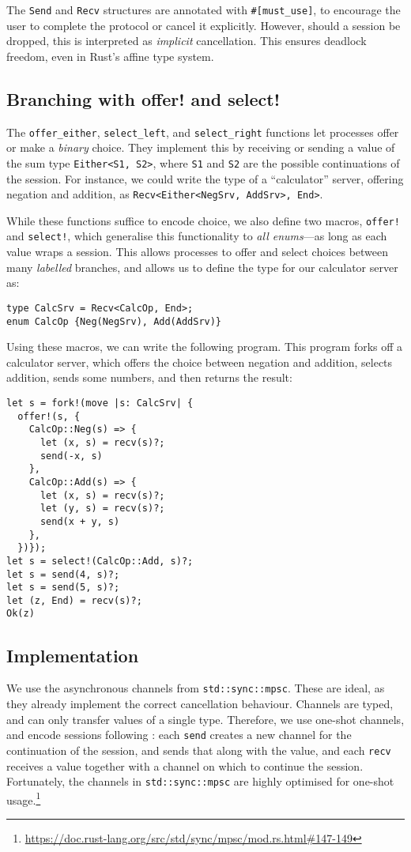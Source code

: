 \documentclass[sigconf,natbib=false]{acmart}
\begin{document}
The \lstinline{Send} and \lstinline{Recv} structures are annotated with \lstinline{#[must_use]}, to encourage the user to complete the protocol or cancel it explicitly. However, should a session be dropped, this is interpreted as \emph{implicit} cancellation. This ensures deadlock freedom, even in Rust's affine type system.

\subsection{Branching with offer! and select!}
The \lstinline{offer_either}, \lstinline{select_left}, and \lstinline{select_right} functions let processes offer or make a \emph{binary} choice. They implement this by receiving or sending a value of the sum type \lstinline{Either<S1, S2>}, where \lstinline{S1} and \lstinline{S2} are the possible continuations of the session. For instance, we could write the type of a ``calculator'' server, offering negation and addition, as \lstinline{Recv<Either<NegSrv, AddSrv>, End>}.

While these functions suffice to encode choice, we also define two macros, \lstinline{offer!} and \lstinline{select!}, which generalise this functionality to \emph{all enums}---as long as each value wraps a session. This allows processes to offer and select choices between many \emph{labelled} branches, and allows us to define the type for our calculator server as:
\begin{lstlisting}
type CalcSrv = Recv<CalcOp, End>;
enum CalcOp {Neg(NegSrv), Add(AddSrv)}
\end{lstlisting}
Using these macros, we can write the following program. This program forks off a calculator server, which offers the choice between negation and addition, selects addition, sends some numbers, and then returns the result:
\begin{lstlisting}
let s = fork!(move |s: CalcSrv| {
  offer!(s, {
    CalcOp::Neg(s) => {
      let (x, s) = recv(s)?;
      send(-x, s)
    },
    CalcOp::Add(s) => {
      let (x, s) = recv(s)?;
      let (y, s) = recv(s)?;
      send(x + y, s)
    },
  })});
let s = select!(CalcOp::Add, s)?;
let s = send(4, s)?;
let s = send(5, s)?;
let (z, End) = recv(s)?;
Ok(z)
\end{lstlisting}

\subsection{Implementation}
We use the asynchronous channels from \lstinline{std::sync::mpsc}. These are ideal, as they already implement the correct cancellation behaviour. Channels are typed, and can only transfer values of a single type. Therefore, we use one-shot channels, and encode sessions following \textcite{dardha2017,scalas2016,padovani2017}: each \lstinline{send} creates a new channel for the continuation of the session, and sends that along with the value, and each \lstinline{recv} receives a value together with a channel on which to continue the session. Fortunately, the channels in \lstinline{std::sync::mpsc} are highly optimised for one-shot usage.\footnote{\url{https://doc.rust-lang.org/src/std/sync/mpsc/mod.rs.html\#147-149}}
\end{document}
